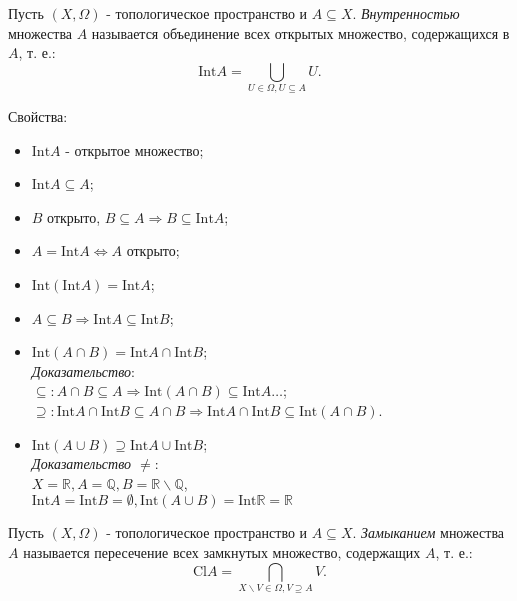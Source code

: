 \documentclass[a4paper,100pt]{article}
\theoremstyle{indented}
\begin{document}
Пусть $(X, \Omega)$ - топологическое пространство и $A\subseteq X$. \textit{Внутренностью} \hypertarget{n7}{множества} $A$ называется объединение всех открытых множество, содержащихся в $A$, т. е.:
\[
    \text{Int} A = \bigcup_{U\in \Omega, U\subseteq A} U.
\]

Свойства:
\begin{itemize}
    
    \item $\text{Int} A $ - открытое множество;
    \item $\text{Int} A \subseteq A$;
    \item $B$ открыто, $B\subseteq A \Rightarrow B\subseteq \text{Int} A$;
    \item $A = \text{Int}A \Leftrightarrow A$ открыто;
    \item $\text{Int}(\text{Int} A)=\text{Int}A$;
    \item $A \subseteq B \Rightarrow \text{Int} A \subseteq \text{Int} B$;
    \item $\text{Int}(A\cap B) = \text{Int}A\cap\text{Int}B$; \\ 
    \textit{Доказательство}:\\
    $\subseteq: A\cap B\subseteq A \Rightarrow \text{Int} (A\cap B)\subseteq \text{Int}A \dots$; \\
    $\supseteq: \text{Int}A\cap\text{Int} B \subseteq A\cap B \Rightarrow \text{Int}A\cap\text{Int}B \subseteq \text{Int}(A\cap B)$.
    \item $\text{Int}(A\cup B)\supseteq \text{Int}A\cup\text{Int}B$; \\
    \textit{Доказательство $\neq$}:\\
    $X = \mathbb{R}, A = \mathbb{Q}, B=\mathbb{R}\backslash \mathbb{Q}$, \\
    $\text{Int}A=\text{Int}B = \emptyset , \text{Int}(A\cup B) = \text{Int}\mathbb{R} = \mathbb{R}$


\end{itemize}

Пусть $(X, \Omega)$ - топологическое пространство и $A\subseteq X$. \textit{Замыканием} \hypertarget{n8}{множества} $A$ называется пересечение всех замкнутых множество, содержащих $A$, т. е.:
\[
    \text{Cl} A = \bigcap_{X\backslash V\in \Omega, V\supseteq A} V.
\]
\end{document}
